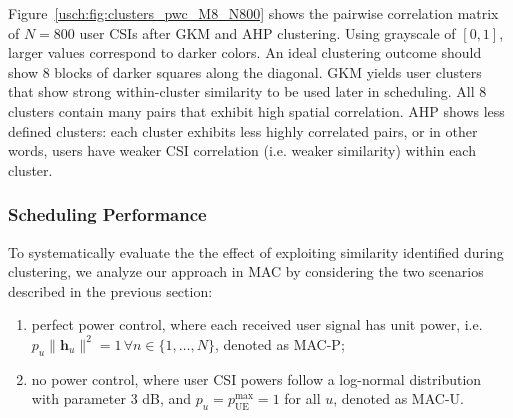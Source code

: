 Figure~\ref{usch:fig:clusters_pwc_M8_N800} shows the pairwise correlation matrix of $N=800$ user CSIs after GKM and AHP clustering. 
Using grayscale of $[0,1]$, larger values correspond to darker colors. 
An ideal clustering outcome should show 8 blocks of darker squares along the diagonal. 
GKM yields user clusters that show strong within-cluster similarity to be used later in scheduling. 
All 8 clusters contain many pairs that exhibit high spatial correlation. 
AHP shows less defined clusters: each cluster exhibits less highly correlated pairs, or in other words, users have weaker CSI correlation (i.e. weaker similarity) within each cluster. 


\subsubsection{Scheduling Performance}


To systematically evaluate the the effect of exploiting similarity identified during clustering, we analyze our approach in MAC by considering the two scenarios described in the previous section:
\begin{enumerate}
\item perfect power control, where each received user signal has  
unit power, i.e. $p_u\|\bm{h}_u\|^2=1\,\forall n\in\{1,\ldots,N\}$, denoted as MAC-P;
\item no power control, where user CSI powers follow a log-normal distribution with parameter 3 dB, and $p_u=p_{\mathrm{UE}}^{\mathrm{max}}=1$ for all $u$, denoted as MAC-U.
\end{enumerate}

